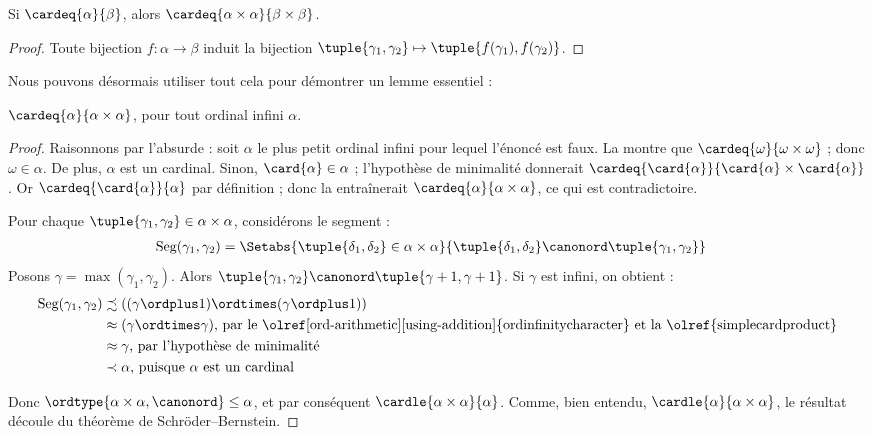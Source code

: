 \documentclass[../../../include/open-logic-section]{subfiles}
\begin{document}
\begin{prop}
Si $\cardeq{\alpha}{\beta}$, alors
$\cardeq{\alpha \times \alpha}{\beta \times \beta}$.
\end{prop}

\begin{proof}
Toute bijection
$f \colon \alpha \to \beta$ induit la bijection
$\tuple{\gamma_1, \gamma_2} \mapsto
\tuple{f(\gamma_1), f(\gamma_2)}$.
\end{proof}
\noindent
Nous pouvons désormais utiliser tout cela pour
démontrer un lemme essentiel :

\begin{lem}
$\cardeq{\alpha}{\alpha \times \alpha}$,
pour tout ordinal infini $\alpha$.
\end{lem}

\begin{proof}
Raisonnons par l'absurde : soit $\alpha$ le plus
petit ordinal infini pour lequel l'énoncé est faux.
La 
montre que
$\cardeq{\omega}{\omega\times\omega}$ ;
donc $\omega \in \alpha$.
De plus, $\alpha$ est un cardinal. Sinon,
$\card{\alpha} \in \alpha$ ; l'hypothèse de
minimalité donnerait
$\cardeq{\card{\alpha}}
{\card{\alpha} \times \card{\alpha}}$.
Or $\cardeq{\card{\alpha}}{\alpha}$ par définition ;
donc la  entraînerait
$\cardeq{\alpha}{\alpha\times\alpha}$,
ce qui est contradictoire.

Pour chaque
$\tuple{\gamma_1, \gamma_2} \in \alpha \times \alpha$,
considérons le segment :
\begin{align*}
	\text{Seg}(\gamma_1, \gamma_2)
	&= \Setabs{\tuple{\delta_1, \delta_2}
	\in \alpha \times \alpha}
	{\tuple{\delta_1, \delta_2}
	\canonord \tuple{\gamma_1, \gamma_2}}
\end{align*}
Posons $\gamma = \max(\gamma_1, \gamma_2)$.
Alors $\tuple{\gamma_1, \gamma_2}
\canonord \tuple{\gamma+1, \gamma + 1}$.
Si $\gamma$ est infini, on obtient :
\begin{align*}
	\text{Seg}(\gamma_1, \gamma_2) &
	\precsim ((\gamma \ordplus 1)
	\ordtimes (\gamma \ordplus 1))\\
	&\approx (\gamma \ordtimes \gamma)
	\text{, par le
	\olref[ord-arithmetic][using-addition]{ordinfinitycharacter}
	et la \olref{simplecardproduct}}\\
	&\approx \gamma
	\text{, par l'hypothèse de minimalité}\\
	& \prec \alpha
	\text{, puisque $\alpha$ est un cardinal}
\end{align*}



Donc $\ordtype{\alpha\times \alpha, \canonord}
\leq \alpha$, et par conséquent
$\cardle{\alpha \times \alpha}{\alpha}$.
Comme, bien entendu,
$\cardle{\alpha}{\alpha \times \alpha}$,
le résultat découle du théorème de
Schröder--Bernstein.
\end{proof}
\end{document}
